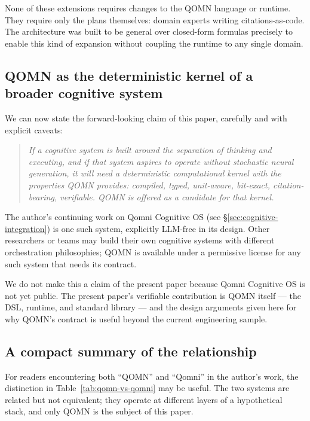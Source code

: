 \documentclass[11pt,a4paper]{article}
\begin{document}
\begin{enumerate}[leftmargin=*]
None of these extensions requires changes to the QOMN language or runtime. They require only the plans themselves: domain experts writing citations-as-code. The architecture was built to be general over closed-form formulas precisely to enable this kind of expansion without coupling the runtime to any single domain.

\subsection{QOMN as the deterministic kernel of a broader cognitive system}

We can now state the forward-looking claim of this paper, carefully and with explicit caveats:

\begin{quote}
\emph{If a cognitive system is built around the separation of thinking and executing, and if that system aspires to operate without stochastic neural generation, it will need a deterministic computational kernel with the properties QOMN provides: compiled, typed, unit-aware, bit-exact, citation-bearing, verifiable. QOMN is offered as a candidate for that kernel.}
\end{quote}

The author's continuing work on Qomni Cognitive OS (see \S\ref{sec:cognitive-integration}) is one such system, explicitly LLM-free in its design. Other researchers or teams may build their own cognitive systems with different orchestration philosophies; QOMN is available under a permissive license for any such system that needs its contract.

We do not make this a claim of the present paper because Qomni Cognitive OS is not yet public. The present paper's verifiable contribution is QOMN itself --- the DSL, runtime, and standard library --- and the design arguments given here for why QOMN's contract is useful beyond the current engineering sample.

\subsection{A compact summary of the relationship}

For readers encountering both ``QOMN'' and ``Qomni'' in the author's work, the distinction in Table~\ref{tab:qomn-vs-qomni} may be useful. The two systems are related but not equivalent; they operate at different layers of a hypothetical stack, and only QOMN is the subject of this paper.


\end{enumerate}
\end{document}
